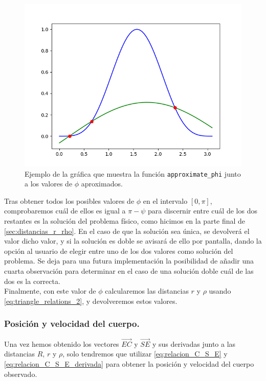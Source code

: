 \begin{figure}[H]
\centering
\includegraphics[scale=0.6]{images/example_newton.png}
\caption{Ejemplo de la gráfica que muestra la función \texttt{approximate\_phi} junto a los valores de $\phi$ aproximados.}
\end{figure}

Tras obtener todos los posibles valores de $\phi$ en el intervalo $[0,\pi]$, comprobaremos cuál de ellos es igual a $\pi-\psi$ para discernir entre cuál de los dos restantes es la solución del problema físico, como hicimos en la parte final de \ref{sec:distancias_r_rho}. En el caso de que la solución sea única, se devolverá el valor dicho valor, y si la solución es doble se avisará de ello por pantalla, dando la opción al usuario de elegir entre uno de los dos valores como solución del problema. Se deja para una futura implementación la posibilidad de añadir una cuarta observación para determinar en el caso de una solución doble cuál de las dos es la correcta.\\

Finalmente, con este valor de $\phi$ calcularemos las distancias $r$ y $\rho$ usando \eqref{eq:triangle_relations_2}, y devolveremos estos valores.\\

\subsubsection{Posición y velocidad del cuerpo.}
Una vez hemos obtenido los vectores $\overrightarrow{EC}$ y $\overrightarrow{SE}$ y sus derivadas junto a las distancias $R$, $r$ y $\rho$, solo tendremos que utilizar \eqref{eq:relacion_C_S_E} y \eqref{eq:relacion_C_S_E_derivada} para obtener la posición y velocidad del cuerpo observado.\\

